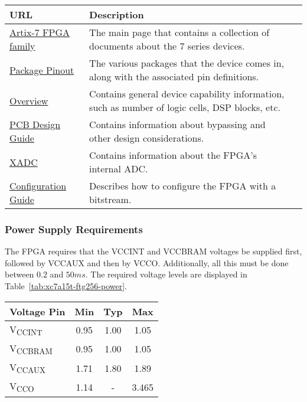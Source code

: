 \label{tab:xc7a15t-ftg256-documents}
\begin{tabularx}{\textwidth}{l X>{\raggedright\arraybackslash}X}
        \caption{Important documents.} \\
        \toprule
        \textbf{URL} & \textbf{Description} \\
        \midrule \endhead
        \href{https://www.xilinx.com/products/silicon-devices/fpga/artix-7.html?resultsTablePreSelect=documenttype:Data\%20Sheets\#documentation}{Artix-7
          FPGA family} & The main page that contains a collection of documents about the 7 series
        devices. \\
        \href{https://www.xilinx.com/support/documentation/user_guides/ug475_7Series_Pkg_Pinout.pdf}{Package
          Pinout} & The various packages that the device comes in, along with the associated pin
        definitions. \\
        \href{https://www.xilinx.com/support/documentation/data_sheets/ds180_7Series_Overview.pdf}{Overview}
        & Contains general device capability information, such as number of logic cells, DSP blocks,
        etc. \\
        \href{https://www.xilinx.com/support/documentation/user_guides/ug483_7Series_PCB.pdf}{PCB
          Design Guide} &
        Contains information about bypassing and other design considerations. \\
        \href{https://www.xilinx.com/support/documentation/user_guides/ug480_7Series_XADC.pdf}{XADC}
        & Contains information about the FPGA's internal ADC. \\
        \href{https://www.xilinx.com/support/documentation/user_guides/ug470_7Series_Config.pdf}{Configuration
          Guide} & Describes how to configure the FPGA with a bitstream. \\
        \bottomrule
\end{tabularx}

\subsubsection{Power Supply Requirements}
\label{sec:xc7a15t-ftg256-power}

The FPGA requires that the VCCINT and VCCBRAM voltages be supplied first, followed by VCCAUX and
then by VCCO. Additionally, all this must be done between $0.2$ and $50 \si{ms}$. The required
voltage levels are displayed in Table~\ref{tab:xc7a15t-ftg256-power}.

\label{tab:xc7a15t-ftg256-power}
\begin{tabularx}{\textwidth}{l c c c}
        \caption{XC7A15T-FTG256 power supply requirements.} \\
        \toprule
        Voltage Pin & Min & Typ & Max \\
        \midrule
        V\textsubscript{CCINT} & 0.95 & 1.00 & 1.05 \\
        V\textsubscript{CCBRAM} & 0.95 & 1.00 & 1.05 \\
        V\textsubscript{CCAUX} & 1.71 & 1.80 & 1.89 \\
        V\textsubscript{CCO} & 1.14 & - & 3.465 \\
        \bottomrule
\end{tabularx}


